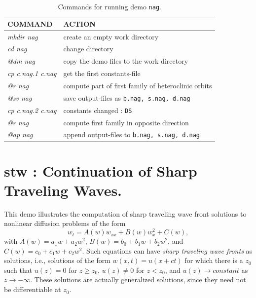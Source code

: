 \documentclass[12pt]{report}
\begin{document}
\begin{table}[htbp]
\begin{center}
\begin{tabular}{| l | l |}
\hline
  COMMAND  & ACTION \\
\hline
  {\it mkdir nag} & create an empty work directory \\ 
  {\it cd nag} & change directory \\
  {\it @dm nag} & copy the demo files to the work directory \\
\hline
  {\it cp c.nag.1 c.nag} & get the first constants-file \\ 
  {\it @r nag} & compute part of first family of heteroclinic orbits \\ 
  {\it @sv nag} & save output-files as {\tt b.nag, s.nag, d.nag} \\ 
\hline
  {\it cp c.nag.2 c.nag} & constants changed : {\tt DS} \\ 
  {\it @r nag} & compute first family in opposite direction \\ 
  {\it @ap nag} & append output-files to {\tt b.nag, s.nag, d.nag} \\ 
\hline
\end{tabular}
\caption{Commands for running demo {\tt nag}.}
\label{tbl:demo_nag}
\end{center}
\end{table}

\newpage
\section{ stw : Continuation of Sharp Traveling Waves.} \label{sec:Demos_stw}
This demo illustrates the computation of sharp traveling wave front solutions
to nonlinear diffusion problems of the form
$$ w_t = A(w) w_{xx} + B(w) w_x^{2} + C(w),  $$
with
$A(w) = a_1 w + a_2 w^{2}$,
$B(w) = b_0 + b_1 w + b_2 w^{2}$,
and
$C(w) = c_0 + c_1 w + c_2 w^{2}$.
Such equations can have {\it sharp traveling wave fronts} as solutions, i.e., solutions of the form
$w(x,t)=u(x+ct)$ for which there is a $z_0$ such that
$u(z)=0$ for $z \ge z_0$,
$u(z) \not= 0$ for $z < z_0$, and
$u(z) \rightarrow constant$ as $z \rightarrow -\infty$.
These solutions are actually generalized solutions, since they need
not be differentiable at $z_0$.
\end{document}

